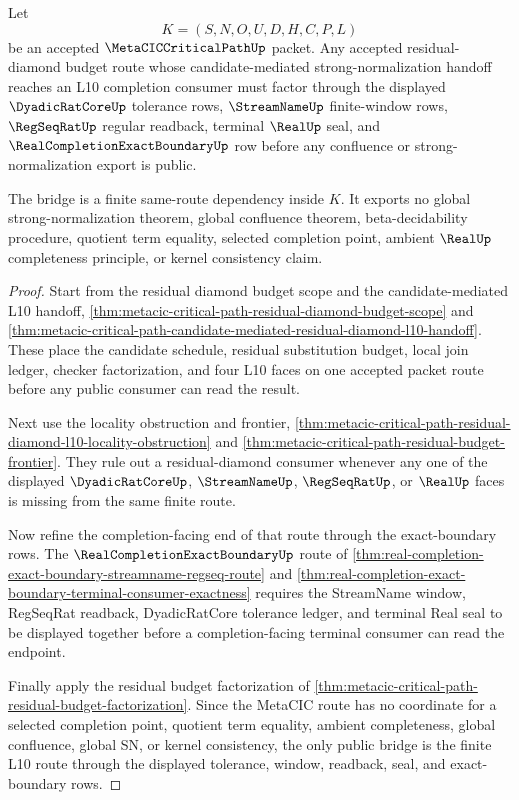 \begin{theorem}
\label{thm:metacic-critical-path-residual-budget-bridge}
Let
$$
K=(S,N,O,U,D,H,C,P,L)
$$
be an accepted $\MetaCICCriticalPathUp$ packet. Any accepted residual-diamond budget route whose candidate-mediated strong-normalization handoff reaches an L10 completion consumer must factor through the displayed $\DyadicRatCoreUp$ tolerance rows, $\StreamNameUp$ finite-window rows, $\RegSeqRatUp$ regular readback, terminal $\RealUp$ seal, and $\RealCompletionExactBoundaryUp$ row before any confluence or strong-normalization export is public.

The bridge is a finite same-route dependency inside $K$. It exports no global strong-normalization theorem, global confluence theorem, beta-decidability procedure, quotient term equality, selected completion point, ambient $\RealUp$ completeness principle, or kernel consistency claim.
\end{theorem}
\begin{proof}
Start from the residual diamond budget scope and the candidate-mediated L10 handoff, \autoref{thm:metacic-critical-path-residual-diamond-budget-scope} and \autoref{thm:metacic-critical-path-candidate-mediated-residual-diamond-l10-handoff}. These place the candidate schedule, residual substitution budget, local join ledger, checker factorization, and four L10 faces on one accepted packet route before any public consumer can read the result.

Next use the locality obstruction and frontier, \autoref{thm:metacic-critical-path-residual-diamond-l10-locality-obstruction} and \autoref{thm:metacic-critical-path-residual-budget-frontier}. They rule out a residual-diamond consumer whenever any one of the displayed $\DyadicRatCoreUp$, $\StreamNameUp$, $\RegSeqRatUp$, or $\RealUp$ faces is missing from the same finite route.

Now refine the completion-facing end of that route through the exact-boundary rows. The $\RealCompletionExactBoundaryUp$ route of \autoref{thm:real-completion-exact-boundary-streamname-regseq-route} and \autoref{thm:real-completion-exact-boundary-terminal-consumer-exactness} requires the StreamName window, RegSeqRat readback, DyadicRatCore tolerance ledger, and terminal Real seal to be displayed together before a completion-facing terminal consumer can read the endpoint.

Finally apply the residual budget factorization of \autoref{thm:metacic-critical-path-residual-budget-factorization}. Since the MetaCIC route has no coordinate for a selected completion point, quotient term equality, ambient completeness, global confluence, global SN, or kernel consistency, the only public bridge is the finite L10 route through the displayed tolerance, window, readback, seal, and exact-boundary rows.
\end{proof}

